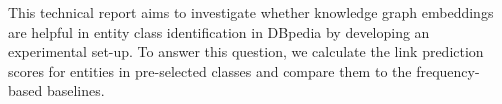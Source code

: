 This technical report aims to investigate whether knowledge graph embeddings are helpful in entity class identification in DBpedia by developing an experimental set-up. To answer this question, we calculate the link prediction scores for entities in pre-selected classes and compare them to the frequency-based baselines.